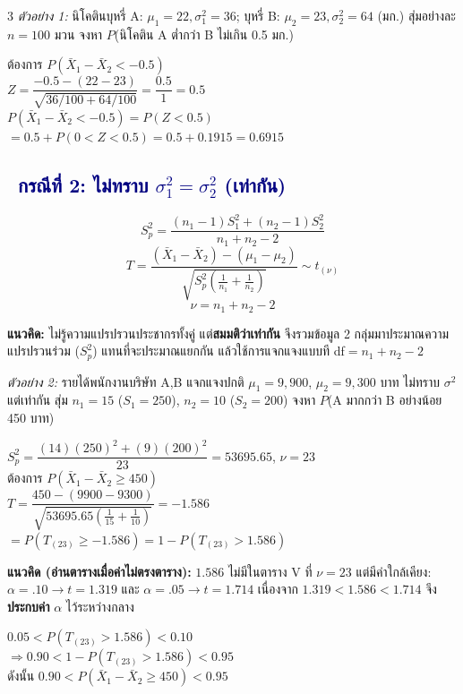 \documentclass[9pt]{extarticle}
\newcommand{\dist}[1]{\subsection*{\textcolor{navy}{\textbullet\ #1}}}
\begin{document}
\begin{multicols}{3}
\textit{ตัวอย่าง 1:} นิโคตินบุหรี่ A: $\mu_1{=}22,\sigma_1^2{=}36$; บุหรี่ B: $\mu_2{=}23,\sigma_2^2{=}64$ (มก.) สุ่มอย่างละ $n{=}100$ มวน จงหา $P$(นิโคติน A ต่ำกว่า B ไม่เกิน 0.5 มก.)
\begin{solbox}
ต้องการ $P(\bar X_1-\bar X_2<-0.5)$\\
$Z=\dfrac{-0.5-(22-23)}{\sqrt{36/100+64/100}}=\dfrac{0.5}{1}=0.5$\\
$P(\bar X_1{-}\bar X_2{<}{-0.5})=P(Z{<}0.5)$\\
$=0.5+P(0{<}Z{<}0.5)=0.5+0.1915=0.6915$
\end{solbox}

\dist{กรณีที่ 2: ไม่ทราบ $\sigma_1^2{=}\sigma_2^2$ (เท่ากัน)}
\begin{formulabox}
$$S_p^2=\dfrac{(n_1{-}1)S_1^2+(n_2{-}1)S_2^2}{n_1+n_2-2}$$
$$T=\dfrac{(\bar X_1-\bar X_2)-(\mu_1-\mu_2)}{\sqrt{S_p^2\left(\frac1{n_1}+\frac1{n_2}\right)}}\sim t_{(\nu)}$$
$$\nu=n_1+n_2-2$$
\end{formulabox}
\begin{ideabox}
\textbf{แนวคิด:} ไม่รู้ความแปรปรวน\allowbreak ประชากรทั้งคู่ แต่\allowbreak \textbf{สมมติว่าเท่ากัน} จึงรวม\allowbreak ข้อมูล 2 กลุ่มมาประมาณ\allowbreak ความแปรปรวนร่วม ($S_p^2$) แทนที่จะ\allowbreak ประมาณแยกกัน แล้วใช้การแจกแจง\allowbreak แบบที df$=n_1{+}n_2{-}2$
\end{ideabox}

\textit{ตัวอย่าง 2:} รายได้พนักงานบริษัท A,B แจกแจงปกติ $\mu_1{=}9{,}900$, $\mu_2{=}9{,}300$ บาท ไม่ทราบ $\sigma^2$ แต่เท่ากัน สุ่ม $n_1{=}15$ ($S_1{=}250$), $n_2{=}10$ ($S_2{=}200$) จงหา $P$(A มากกว่า B อย่างน้อย 450 บาท)
\begin{solbox}
$S_p^2=\dfrac{(14)(250)^2+(9)(200)^2}{23}=53695.65$, $\nu{=}23$\\
ต้องการ $P(\bar X_1-\bar X_2\ge450)$\\
$T=\dfrac{450-(9900-9300)}{\sqrt{53695.65(\frac1{15}+\frac1{10})}}=-1.586$\\
$=P(T_{(23)}\ge-1.586)=1-P(T_{(23)}{>}1.586)$
\end{solbox}
\begin{ideabox}
\textbf{แนวคิด (อ่านตารางเมื่อค่าไม่ตรงตาราง):} $1.586$ ไม่มีในตาราง V ที่ $\nu{=}23$ แต่มีค่าใกล้เคียง: $\alpha{=}.10\to t{=}1.319$ และ $\alpha{=}.05\to t{=}1.714$ เนื่องจาก $1.319<1.586<1.714$ จึง\textbf{ประกบค่า} $\alpha$ ไว้ระหว่างกลาง
\end{ideabox}
\begin{solbox}
$0.05<P(T_{(23)}{>}1.586)<0.10$\\
$\Rightarrow 0.90<1-P(T_{(23)}{>}1.586)<0.95$\\
ดังนั้น $0.90<P(\bar X_1-\bar X_2\ge450)<0.95$
\end{solbox}


\end{multicols}
\end{document}
